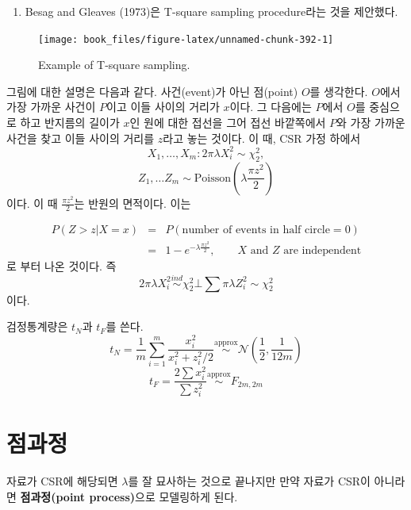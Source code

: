 \documentclass[b5paper,]{scrbook}
\providecommand{\tightlist}{%
  \setlength{\itemsep}{0pt}\setlength{\parskip}{0pt}}
\theoremstyle{plain}
\theoremstyle{definition}
\numberwithin{equation}{section}
\begin{document}
\begin{enumerate}
\def\labelenumi{\arabic{enumi}.}
\setcounter{enumi}{1}
\tightlist
\item
  Besag and Gleaves (1973)은 T-square sampling procedure라는 것을 제안했다.
\end{enumerate}

\begin{figure}

{\centering \texttt{[image: book\_files/figure-latex/unnamed-chunk-392-1]} 

}

\caption{Example of T-square sampling.}\label{fig:unnamed-chunk-392}
\end{figure}

그림에 대한 설명은 다음과 같다. 사건(event)가 아닌 점(point) \(O\)를 생각한다. \(O\)에서 가장 가까운 사건이 \(P\)이고 이들 사이의 거리가 \(x\)이다. 그 다음에는 \(P\)에서 \(O\)를 중심으로 하고 반지름의 길이가 \(x\)인 원에 대한 접선을 그어 접선 바깥쪽에서 \(P\)와 가장 가까운 사건을 찾고 이들 사이의 거리를 \(z\)라고 놓는 것이다. 이 때, CSR 가정 하에서
\[X_{1}, \ldots, X_{m}: 2\pi\lambda X_{i}^{2} \sim \chi_{2}^{2},\]
\[Z_{1}, \ldots Z_{m} \sim \text{Poisson}(\lambda \frac{\pi z^{2}}{2})\]
이다. 이 때 \(\frac{\pi z^{2}}{2}\)는 반원의 면적이다. 이는

\begin{eqnarray*}
P(Z>z|X=x)&=& P(\text{number of events in half circle}=0)\\
&=& 1-e^{-\lambda \frac{\pi z^{2}}{2}}, \qquad{X \text{ and } Z \text{ are independent}}
\end{eqnarray*}
로 부터 나온 것이다. 즉
\[2\pi\lambda X_{i}^{2} \stackrel{ind}{\sim} \chi_{2}^{2} \bot \sum \pi\lambda Z_{i}^{2} \sim \chi_{2}^{2}\]
이다.

검정통계량은 \(t_{N}\)과 \(t_{F}\)를 쓴다.
\[t_{N}=\frac{1}{m}\sum_{i=1}^{m}\frac{x_{i}^{2}}{x_{i}^{2} + z_{i}^{2}/2} \stackrel{\text{approx}}{\sim}\mathcal{N}(\frac{1}{2}, \frac{1}{12m})\]
\[t_{F}=\frac{2\sum x_{i}^{2}}{\sum z_{i}^2} \stackrel{\text{approx}}{\sim} F_{2m,2m}\]

\hypertarget{pointprocess}{%
\chapter{점과정}\label{pointprocess}}

자료가 CSR에 해당되면 \(\lambda\)를 잘 묘사하는 것으로 끝나지만 만약 자료가 CSR이 아니라면 \textbf{점과정(point process)}으로 모델링하게 된다.
\end{document}
